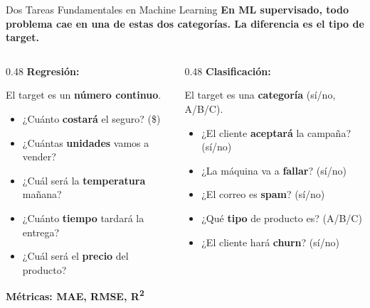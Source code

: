 \documentclass[aspectratio=169, 11pt]{beamer}
\begin{document}
\begin{frame}[shrink=8]{Dos Tareas Fundamentales en Machine Learning}
  \vspace{-4pt}
  {\footnotesize\color{arcaDark}\bfseries
    En ML supervisado, todo problema cae en una de estas dos categorías.
    La diferencia es el \textbf{tipo de target}.}

  \vspace{6pt}
  \begin{columns}[T]
    \begin{column}{0.48\textwidth}
      {\footnotesize\bfseries\color{codeBlue}\faChartLine\hspace{4pt}
        Regresión:}
      \vspace{4pt}

      {\scriptsize
      El target es un \textbf{número continuo}.

      \vspace{4pt}
      \begin{itemize}\setlength{\itemsep}{4pt}
        \item ¿Cuánto \textbf{costará} el seguro? (\$)
        \item ¿Cuántas \textbf{unidades} vamos a vender?
        \item ¿Cuál será la \textbf{temperatura} mañana?
        \item ¿Cuánto \textbf{tiempo} tardará la entrega?
        \item ¿Cuál será el \textbf{precio} del producto?
      \end{itemize}
      }

      \vspace{4pt}
      {\scriptsize\color{codeBlue}\bfseries
        Métricas: MAE, RMSE, R\textsuperscript{2}}
    \end{column}

    \begin{column}{0.48\textwidth}
      {\footnotesize\bfseries\color{arcaRed}\faCheckCircle\hspace{4pt}
        Clasificación:}
      \vspace{4pt}

      {\scriptsize
      El target es una \textbf{categoría} (sí/no, A/B/C).

      \vspace{4pt}
      \begin{itemize}\setlength{\itemsep}{4pt}
        \item ¿El cliente \textbf{aceptará} la campaña? (sí/no)
        \item ¿La máquina va a \textbf{fallar}? (sí/no)
        \item ¿El correo es \textbf{spam}? (sí/no)
        \item ¿Qué \textbf{tipo} de producto es? (A/B/C)
        \item ¿El cliente hará \textbf{churn}? (sí/no)
      \end{itemize}
      }


\end{column}
\end{columns}
\end{frame}
\end{document}
